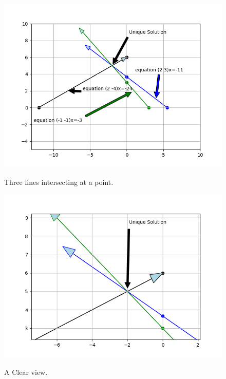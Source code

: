 \documentclass[journal,12pt,twocolumn]{IEEEtran}
\begin{document}
\begin{figure}[htbp]
  \centering \includegraphics[width=\columnwidth]{assignment1solution_graph1.png}\label{fig0}
  \caption{Three lines intersecting at a point.}\label{cap2}
  \label{fig:Intersection point (-2,5)}
\end{figure} 
\begin{figure}[htbp]
  \centering \includegraphics[width=\columnwidth]{assignment1solution_graph.png}\label{fig1}
  \caption{A Clear view.}\label{cap1}
  \label{fig:Intersection point (-2,5)}
\end{figure} 
\end{document}
